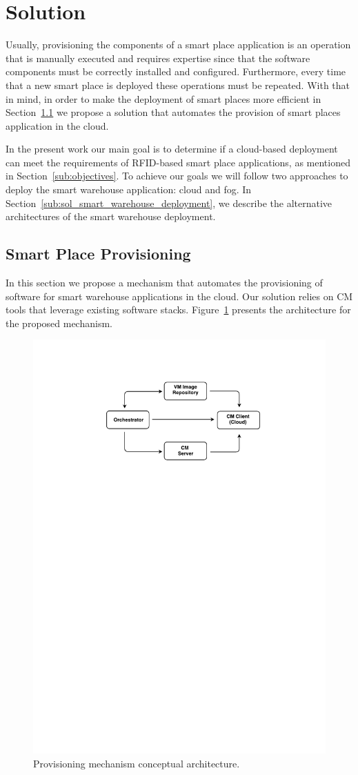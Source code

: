 
\section{Solution}
\label{sec:solution}
Usually, provisioning the components of a smart place application is an operation
that is manually executed and requires expertise since that the software components must
be correctly installed and configured. Furthermore, every time that a new smart place is deployed
these operations must be repeated. With that in mind, in order to make the deployment of
smart places more efficient in Section~\ref{subs:sol_provisioning} we propose a solution
that automates the provision of smart places application in the cloud.

In the present work our main goal is to determine if a cloud-based deployment can meet the
requirements of RFID-based smart place applications, as mentioned in Section~\ref{sub:objectives}.
To achieve our goals we will follow two approaches to deploy the smart warehouse application: cloud
and fog. In Section~\ref{sub:sol_smart_warehouse_deployment}, we describe the alternative
architectures of the smart warehouse deployment.

\subsection{Smart Place Provisioning}
\label{subs:sol_provisioning}
In this section we propose a mechanism that automates the provisioning of software for smart warehouse
applications in the cloud. Our solution relies on \acrfull{CM} tools that leverage existing software
stacks. Figure~\ref{fig:provisioning_generic_architecture} presents the architecture for the proposed
mechanism.

\begin{figure}[ht!]
  \centering
  \includegraphics[width=.4\textwidth]{./figures/c4t-generic-solution.pdf}
  \caption[Provisioning mechanism conceptual architecture.]{Provisioning mechanism conceptual architecture.}
  \label{fig:provisioning_generic_architecture}
\end{figure}


